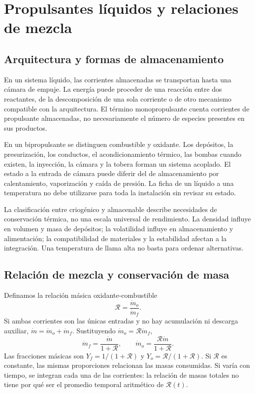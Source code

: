 \chapter{Propulsantes líquidos y relaciones de mezcla}\label{ch:14}
\section{Arquitectura y formas de almacenamiento}
En un sistema líquido, las corrientes almacenadas se transportan hasta una cámara de empuje. La energía puede proceder de una reacción entre dos reactantes, de la descomposición de una sola corriente o de otro mecanismo compatible con la arquitectura. El término monopropulsante cuenta corrientes de propulsante almacenadas, no necesariamente el número de especies presentes en sus productos.

En un bipropulsante se distinguen combustible y oxidante. Los depósitos, la presurización, los conductos, el acondicionamiento térmico, las bombas cuando existen, la inyección, la cámara y la tobera forman un sistema acoplado. El estado a la entrada de cámara puede diferir del de almacenamiento por calentamiento, vaporización y caída de presión. La ficha de un líquido a una temperatura no debe utilizarse para toda la instalación sin revisar su estado.

La clasificación entre criogénico y almacenable describe necesidades de conservación térmica, no una escala universal de rendimiento. La densidad influye en volumen y masa de depósitos; la volatilidad influye en almacenamiento y alimentación; la compatibilidad de materiales y la estabilidad afectan a la integración. Una temperatura de llama alta no basta para ordenar alternativas.\cite{MIT19,SP125}
\section{Relación de mezcla y conservación de masa}
Definamos la relación másica oxidante-combustible
\[
 \mathcal R=\frac{\dot m_o}{\dot m_f}.
\]
Si ambas corrientes son las únicas entradas y no hay acumulación ni descarga auxiliar, $\dot m=\dot m_o+\dot m_f$. Sustituyendo $\dot m_o=\mathcal R\dot m_f$,
\begin{equation}\label{eq:mixflows}
 \dot m_f=\frac{\dot m}{1+\mathcal R},\qquad
 \dot m_o=\frac{\mathcal R\dot m}{1+\mathcal R}.
\end{equation}
Las fracciones másicas son $Y_f=1/(1+\mathcal R)$ y $Y_o=\mathcal R/(1+\mathcal R)$. Si $\mathcal R$ es constante, las mismas proporciones relacionan las masas consumidas. Si varía con tiempo, se integran cada una de las corrientes: la relación de masas totales no tiene por qué ser el promedio temporal aritmético de $\mathcal R(t)$.


